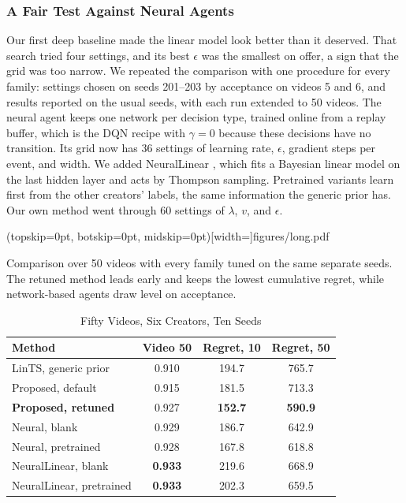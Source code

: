 \documentclass{ieeeaccess}
\begin{document}
\subsubsection{A Fair Test Against Neural Agents}
\label{sec:fair}
Our first deep baseline made the linear model look better than it deserved. That search tried four settings, and its best $\epsilon$ was the smallest on offer, a sign that the grid was too narrow. We repeated the comparison with one procedure for every family: settings chosen on seeds 201--203 by acceptance on videos 5 and 6, and results reported on the usual seeds, with each run extended to 50 videos. The neural agent keeps one network per decision type, trained online from a replay buffer, which is the DQN recipe \cite{mnih2015} with $\gamma=0$ because these decisions have no transition. Its grid now has 36 settings of learning rate, $\epsilon$, gradient steps per event, and width. We added NeuralLinear \cite{riquelme2018}, which fits a Bayesian linear model on the last hidden layer and acts by Thompson sampling. Pretrained variants learn first from the other creators' labels, the same information the generic prior has. Our own method went through 60 settings of $\lambda$, $v$, and $\epsilon$.

\Figure[t!](topskip=0pt, botskip=0pt, midskip=0pt)[width=\textwidth]{figures/long.pdf}
{\parbox[t]{0.91\textwidth}{\raggedright Comparison over 50 videos with every family tuned on the same separate seeds. The retuned method leads early and keeps the lowest cumulative regret, while network-based agents draw level on acceptance.}\label{fig:deep}}

\begin{table}[t]
\caption{Fifty Videos, Six Creators, Ten Seeds}
\label{tab:long}
\setlength{\tabcolsep}{3pt}
\centering
\begin{tabular}{|l|c|c|c|}
\hline
Method & Video 50 & Regret, 10 & Regret, 50 \\
\hline
LinTS, generic prior & 0.910 & 194.7 & 765.7 \\
Proposed, default & 0.915 & 181.5 & 713.3 \\
\textbf{Proposed, retuned} & 0.927 & \textbf{152.7} & \textbf{590.9} \\
Neural, blank & 0.929 & 186.7 & 642.9 \\
Neural, pretrained & 0.928 & 167.8 & 618.8 \\
NeuralLinear, blank & \textbf{0.933} & 219.6 & 668.9 \\
NeuralLinear, pretrained & \textbf{0.933} & 202.3 & 659.5 \\
\hline
\end{tabular}
\end{table}
\end{document}
